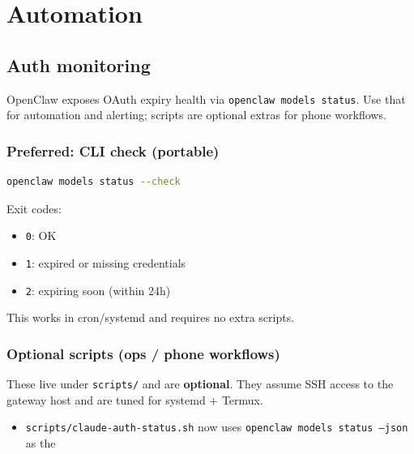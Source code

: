 \chapter{Automation}

\section{Auth monitoring}


OpenClaw exposes OAuth expiry health via \texttt{openclaw models status}. Use that for
automation and alerting; scripts are optional extras for phone workflows.

\subsection{Preferred: CLI check (portable)}


\begin{lstlisting}[language=bash]
openclaw models status --check
\end{lstlisting}


Exit codes:

\begin{itemize}
  \item \texttt{0}: OK
  \item \texttt{1}: expired or missing credentials
  \item \texttt{2}: expiring soon (within 24h)
\end{itemize}


This works in cron/systemd and requires no extra scripts.

\subsection{Optional scripts (ops / phone workflows)}


These live under \texttt{scripts/} and are \textbf{optional}. They assume SSH access to the
gateway host and are tuned for systemd + Termux.

\begin{itemize}
  \item \texttt{scripts/claude-auth-status.sh} now uses \texttt{openclaw models status --json} as the
\end{itemize}

